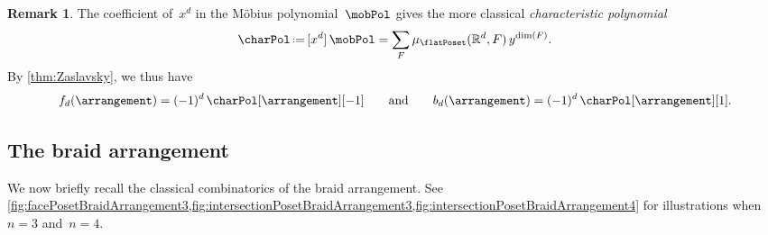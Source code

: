 \documentclass{amsart}
\newcommand{\darkblue}{\color{darkblue}} %
\theoremstyle{definition}
\newtheorem{remark}[theorem]{Remark}
\newcommand{\R}{\mathbb{R}} %
\newcommand{\eqdef}{\mbox{\,\raisebox{0.2ex}{\scriptsize\ensuremath{\mathrm:}}\ensuremath{=}\,}} %
\newcommand{\defn}[1]{\textsl{\darkblue #1}} %
\begin{document}
\begin{remark}
\label{rem:characteristicPolynomial}
The coefficient of~$x^d$ in the M\"obius polynomial~$\mobPol$ gives the more classical \defn{characteristic polynomial}
\[
\charPol \eqdef [x^d] \, \mobPol = \sum_F \mu_{\flatPoset}(\R^d,F) \, y^{\dim(F)}.
\]
By \cref{thm:Zaslavsky}, we thus have
\[
f_d(\arrangement) = (-1)^d \, \charPol[\arrangement][-1] 
\qquad\text{and}\qquad
b_d(\arrangement) = (-1)^d \, \charPol[\arrangement][1].
\]
\end{remark}


\subsection{The braid arrangement}
\label{subsec:braidArrangement}

We now briefly recall the classical combinatorics of the braid arrangement.
See \cref{fig:facePosetBraidArrangement3,fig:intersectionPosetBraidArrangement3,fig:intersectionPosetBraidArrangement4} for illustrations when~$n = 3$ and~$n = 4$.


\end{document}
